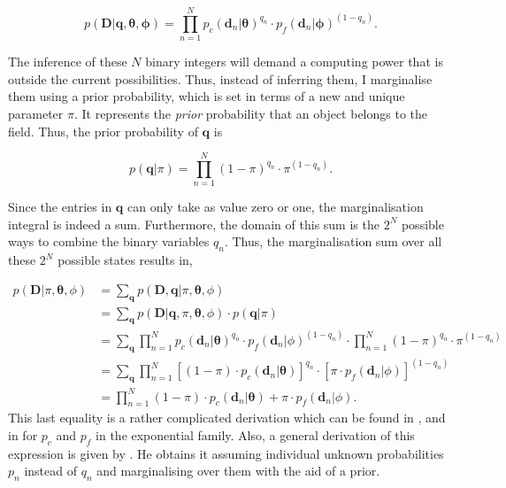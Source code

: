 \begin{equation}
p(\mathbf{D}|\mathbf{q},\boldsymbol{\theta},\boldsymbol{\phi})= \prod_{n=1}^N {p_c(\mathbf{d}_n|\boldsymbol{\theta})}^{q_n}\cdot {p_f(\mathbf{d}_n|\boldsymbol{\phi})}^{(1-q_n)}.
\end{equation}

The inference of these $N$ binary integers will demand a computing power that is outside the current possibilities. Thus, instead of inferring them, I marginalise them using a prior probability, which is set in terms of a new and unique parameter $\pi$. It represents the \emph{prior} probability that an object belongs to the field. Thus, the prior probability of $\mathbf{q}$ is

\begin{equation}
p(\mathbf{q}|\pi)= \prod_{n=1}^N {(1-\pi)}^{q_n}\cdot {\pi}^{(1-q_n)}.
\end{equation}

Since the entries in $\mathbf{q}$ can only take as value zero or one, the marginalisation integral is indeed a sum. Furthermore, the domain of this sum is the $2^N$ possible ways to combine the binary variables $q_n$. Thus, the marginalisation sum over all these $2^N$ possible states results in,

\begin{align}
p(\mathbf{D}|\pi,\boldsymbol{\theta},\phi)&=\sum_{\mathbf{q}} p(\mathbf{D},\mathbf{q}|\pi,\boldsymbol{\theta},\phi)\nonumber\\
&=\sum_{\mathbf{q}} p(\mathbf{D}|\mathbf{q},\pi,\boldsymbol{\theta},\phi)\cdot p(\mathbf{q}|\pi) \nonumber \\
&=\sum_{\mathbf{q}} \prod_{n=1}^N {p_c(\mathbf{d}_n|\boldsymbol{\theta})}^{q_n}\cdot {p_f(\mathbf{d}_n|\phi)}^{(1-q_n)}\cdot \prod_{n=1}^N {(1-\pi)}^{q_n}\cdot {\pi}^{(1-q_n)} \nonumber \\
&=\sum_{\mathbf{q}} \prod_{n=1}^N \left[(1-\pi)\cdot p_c(\mathbf{d}_n|\boldsymbol{\theta})\right]^{q_n}\cdot \left[\pi\cdot p_f(\mathbf{d}_n|\phi)\right]^{(1-q_n)} \nonumber \\
&=\prod_{n=1}^N (1-\pi)\cdot p_c(\mathbf{d}_n|\boldsymbol{\theta}) + \pi\cdot p_f(\mathbf{d}_n|\phi).
\end{align}
This last equality is a rather complicated derivation which can be found in \citet{Press1997}, and in \citet{Hogg2010a} for $p_c$ and $p_f$ in the exponential family. Also, a general derivation of this expression is given by \citet{Jaynes2003}. He obtains it assuming individual unknown probabilities $p_n$ instead of $q_n$ and marginalising over them with the aid of a prior.

